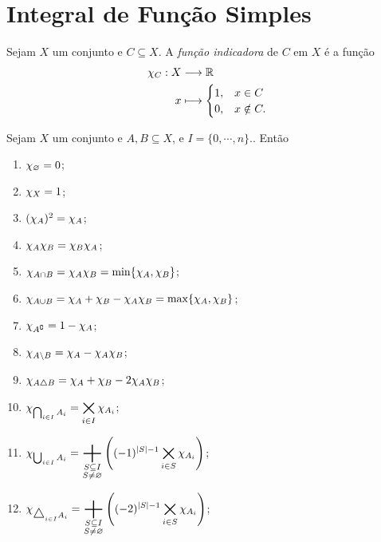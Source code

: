 \section{Integral de Função Simples}

\begin{defi}
Sejam $X$ um conjunto e $C \subseteq X$. A \emph{função indicadora} de $C$ em $X$ é a função
	\begin{align*}
	{\chi_C}: {X} &\longrightarrow {\mathbb{R}} \\{x} &\longmapsto {
	\begin{cases}
		1,& x \in C \\
		0,& x \notin C.
	\end{cases}
	}
	\end{align*}
\end{defi}

\begin{prop}
Sejam $X$ um conjunto e $A,B \subseteq X$, e $I=\{0,\cdots,n\}.$. Então
	\begin{enumerate}
	\item $\chi_\varnothing=0$;
	\item $\chi_X=1$;
	\item $(\chi_A)^2=\chi_A$;
	\item $\chi_A\chi_B=\chi_B\chi_A$;
	\item $\chi_{A \cap B} = \chi_A\chi_B = \min\{\chi_A,\chi_B\}$;
	\item $\chi_{A \cup B} = \chi_A+\chi_B - \chi_A\chi_B = \max\{\chi_A,\chi_B\}$;
	\item $\chi_{A^\complement} = 1- \chi_A$;
	\item $\chi_{A \setminus B} = \chi_A-\chi_A\chi_B$;
	\item $\chi_{A \mathbin{\triangle} B} = \chi_A+\chi_B-2\chi_A\chi_B$;
	\item $\displaystyle\chi_{\bigcap_{i \in I} A_i} = \bigtimes_{i \in I} \chi_{A_i}$;
	\item $\displaystyle\idc_{\bigcup_{i \in I} A_i} = \bigplus_{\substack{S \subseteq I\\S \neq \emptyset}} \left((-1)^{\card{S}-1} \bigtimes_{i \in S}\idc_{A_i}\right)$;
	\item $\displaystyle\idc_{\scalebox{1.2}{$\difsim$}_{i \in I} A_i} = \bigplus_{\substack{S \subseteq I\\S \neq \emptyset}} \left((-2)^{\card{S}-1} \bigtimes_{i \in S}\idc_{A_i} \right)$;
	\end{enumerate}
\end{prop}
